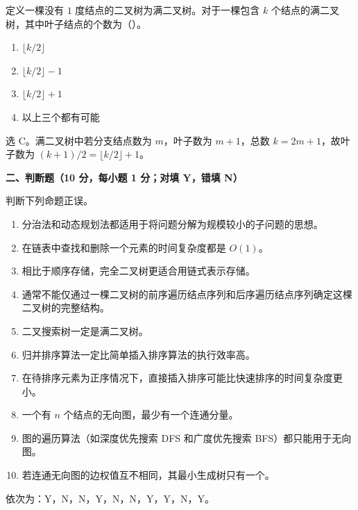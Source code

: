 \begin{question}
定义一棵没有 $1$ 度结点的二叉树为满二叉树。对于一棵包含 $k$ 个结点的满二叉树，其中叶子结点的个数为（\quad）。
\begin{enumerate}
  \item $\lfloor k/2\rfloor$
  \item $\lfloor k/2\rfloor-1$
  \item $\lfloor k/2\rfloor+1$
  \item 以上三个都有可能
\end{enumerate}
\begin{solution}
选 C。满二叉树中若分支结点数为 $m$，叶子数为 $m+1$，总数 $k=2m+1$，故叶子数为 $(k+1)/2=\lfloor k/2\rfloor+1$。
\end{solution}
\end{question}

\textbf{二、判断题（10 分，每小题 1 分；对填 Y，错填 N）}
\begin{question}
判断下列命题正误。
\begin{enumerate}
  \item 分治法和动态规划法都适用于将问题分解为规模较小的子问题的思想。
  \item 在链表中查找和删除一个元素的时间复杂度都是 $O(1)$。
  \item 相比于顺序存储，完全二叉树更适合用链式表示存储。
  \item 通常不能仅通过一棵二叉树的前序遍历结点序列和后序遍历结点序列确定这棵二叉树的完整结构。
  \item 二叉搜索树一定是满二叉树。
  \item 归并排序算法一定比简单插入排序算法的执行效率高。
  \item 在待排序元素为正序情况下，直接插入排序可能比快速排序的时间复杂度更小。
  \item 一个有 $n$ 个结点的无向图，最少有一个连通分量。
  \item 图的遍历算法（如深度优先搜索 DFS 和广度优先搜索 BFS）都只能用于无向图。
  \item 若连通无向图的边权值互不相同，其最小生成树只有一个。
\end{enumerate}
\begin{solution}
依次为：Y，N，N，Y，N，N，Y，Y，N，Y。
\end{solution}
\end{question}

